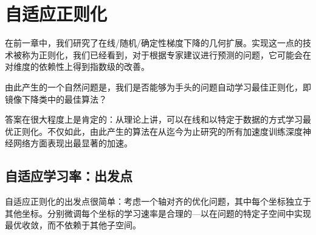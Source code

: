 \chapter{
    自适应正则化
    }\label{sec:adagrad}

在前一章中，我们研究了在线/随机/确定性梯度下降的几何扩展。实现这一点的技术被称为正则化，我们已经看到，对于根据专家建议进行预测的问题，它可能会在对维度的依赖性上得到指数级的改善。

由此产生的一个自然问题是，我们是否能够为手头的问题自动学习最佳正则化，即镜像下降类中的最佳算法？

答案在很大程度上是肯定的：从理论上讲，可以在线和以特定于数据的方式学习最优正则化。不仅如此，由此产生的算法在从迄今为止研究的所有加速度训练深度神经网络方面表现出最显著的加速。


\section{
    自适应学习率：出发点
    }

自适应正则化的出发点很简单：考虑一个轴对齐的优化问题，其中每个坐标独立于其他坐标。分别微调每个坐标的学习速率是合理的---以在问题的特定子空间中实现最优收敛，而不依赖于其他子空间。

